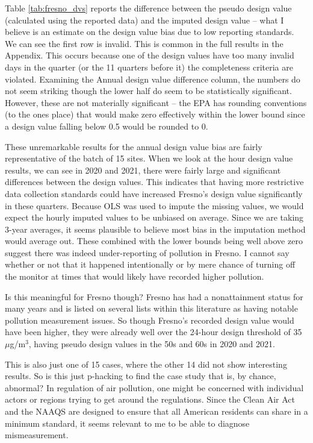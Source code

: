 \documentclass[12pt]{article}
\begin{document}
Table \ref{tab:fresno_dvs} reports the difference between the pseudo design value (calculated using the reported data) and the imputed design value -- what I believe is an estimate on the design value bias due to low reporting standards. We can see the first row is invalid. This is common in the full results in the Appendix. This occurs because one of the design values have too many invalid days in the quarter (or the 11 quarters before it) the completeness criteria are violated. Examining the Annual design value difference column, the numbers do not seem striking though the lower half do seem to be statistically significant. However, these are not materially significant -- the EPA has rounding conventions (to the ones place) that would make zero effectively within the lower bound since a design value falling below 0.5 would be rounded to 0.

These unremarkable results for the annual design value bias are fairly representative of the batch of 15 sites. When we look at the hour design value results, we can see in 2020 and 2021, there were fairly large and significant differences between the design values. This indicates that having more restrictive data collection standards could have increased Fresno's design value significantly in these quarters. Because OLS was used to impute the missing values, we would expect the hourly imputed values to be unbiased on average. Since we are taking 3-year averages, it seems plausible to believe most bias in the imputation method would average out. These combined with the lower bounds being well above zero suggest there was indeed under-reporting of pollution in Fresno. I cannot say whether or not that it happened intentionally or by mere chance of turning off the monitor at times that would likely have recorded higher pollution.

Is this meaningful for Fresno though? Fresno has had a nonattainment status for many years and is listed on several lists within this literature as having notable pollution measurement issues. So though Fresno's recorded design value would have been higher, they were already well over the 24-hour design threshold of 35 $\mu$g/m$^3$, having pseudo design values in the 50s and 60s in 2020 and 2021.

This is also just one of 15 cases, where the other 14 did not show interesting results. So is this just p-hacking to find the case study that is, by chance, abnormal? In regulation of air pollution, one might be concerned with individual actors or regions trying to get around the regulations. Since the Clean Air Act and the NAAQS are designed to ensure that all American residents can share in a minimum standard, it seems relevant to me to be able to diagnose mismeasurement.
\end{document}
